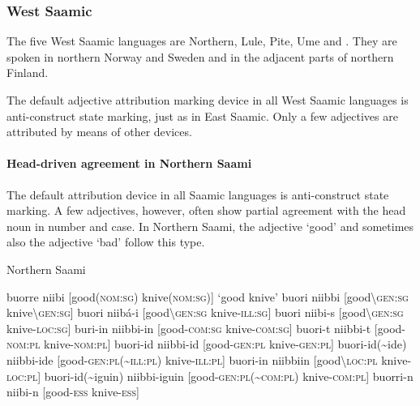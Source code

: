 \subsubsection{West Saamic}
The five West Saamic languages are Northern, Lule, Pite, Ume and . They are spoken in northern Norway and Sweden and in the adjacent parts of northern Finland.

The default adjective attribution marking device in all West Saamic languages is anti-construct state marking, just as in East Saamic. Only a few adjectives are attributed by means of other devices.%

\paragraph{Head-driven agreement in Northern Saami}
The default attribution device in all Saamic languages is anti-construct state marking. A few adjectives, however, often show partial agreement with the head noun in number and case. In Northern Saami, the adjective ‘good’ and sometimes also the adjective ‘bad’ follow this type.
\begin{exe}
\ex \rm{Northern Saami \citep[83]{nickel1990}}
\begin{xlist}
\ex	buorre niibi						\rm{[good(\textsc{nom:sg}) knive(\textsc{nom:sg})] ‘good knive’}
\ex	buori niibbi						\rm{[good\textbackslash\textsc{gen:sg} knive\textbackslash\textsc{gen:sg}]}
\ex	buori niibá-i						\rm{[good\textbackslash\textsc{gen:sg} knive-\textsc{ill:sg}]}
\ex	buori niibi-s						\rm{[good\textbackslash\textsc{gen:sg} knive-\textsc{loc:sg}]}
\ex	buri-in niibbi-in						\rm{[good-\textsc{com:sg} knive-\textsc{com:sg}]}
\ex	buori-t niibbi-t						\rm{[good-\textsc{nom:pl} knive-\textsc{nom:pl}]}
\ex	buori-id niibbi-id					\rm{[good-\textsc{gen:pl} knive-\textsc{gen:pl}]}
\ex	buori-id(\textasciitilde ide) niibbi-ide		\rm{[good-\textsc{gen:pl}(\textasciitilde \textsc{ill:pl}) knive-\textsc{ill:pl}]}
\ex	buori-in niibbiin						\rm{[good\textbackslash\textsc{loc:pl} knive-\textsc{loc:pl}]}
\ex	buori-id(\textasciitilde iguin) niibbi-iguin	\rm{[good-\textsc{gen:pl}(\textasciitilde \textsc{com:pl}) knive-\textsc{com:pl}]}
\ex	buorri-n niibi-n						\rm{[good-\textsc{ess} knive-\textsc{ess}]}
\end{xlist}
\end{exe}

